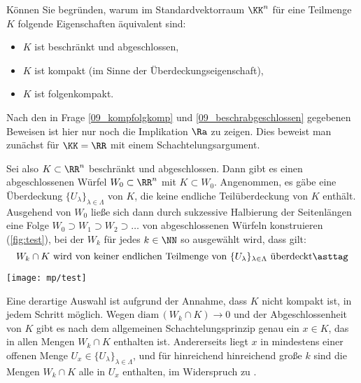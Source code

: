 \begin{frage}\label{09_abkompakt}
  Können Sie begründen, warum im Standardvektorraum $\KK^n$ für eine 
  Teilmenge $K$ folgende Eigenschaften äquivalent sind:
  \begin{itemize}[2mm]
  \item[\desc{a}] $K$ ist beschränkt und abgeschlossen,
  \item[\desc{b}] $K$ ist kompakt (im Sinne der Überdeckungseigenschaft),
  \item[\desc{c}] $K$ ist folgenkompakt.
  \end{itemize}
\end{frage}

\begin{antwort}
  Nach den in Frage \ref{09_kompfolgkomp}
  und \ref{09_beschrabgeschlossen} gegebenen Beweisen ist hier nur 
  noch die Implikation  $\Ra$  zu zeigen. 
  Dies beweist man zunächst für $\KK=\RR$  
  mit einem Schachtelungsargument.  

  Sei also $K\subset \RR^n$ beschränkt und abgeschlossen. 
  Dann gibt es einen  abgeschlossenen Würfel $W_0 \subset \RR^n$ mit 
  $K\subset W_0$. Angenommen, es gäbe eine Überdeckung 
  $\{U_\lambda \}_{\lambda\in \Lambda}$ von 
  $K$, die keine endliche Teilüberdeckung von $K$ enthält. 
  Ausgehend von $W_0$ ließe sich dann durch sukzessive 
  Halbierung der Seitenlängen eine Folge 
  $W_0 \supset W_1 \supset W_2 \supset \ldots$ von 
  abgeschlossenen Würfeln konstruieren (\sieheAbbildung\ref{fig:test}), 
  bei der $W_k$ für jedes $k\in \NN$ so ausgewählt wird, dass gilt: 
  \begin{equation}
    \text{$W_k \cap K$ wird von keiner 
      endlichen Teilmenge von $\{ U_\lambda \}_{\lambda \in\Lambda }$
      überdeckt}
    \asttag
  \end{equation}

  \begin{center}
    \texttt{[image: mp/test]}
    \label{fig:test}
  \end{center}

  Eine derartige Auswahl ist aufgrund der Annahme, dass $K$ nicht kompakt ist, 
  in jedem Schritt möglich. Wegen $\mathrm{diam}\,( W_k \cap K )\to 0$ 
  und der Abgeschlossenheit von $K$ gibt es nach dem allgemeinen 
  Schachtelungsprinzip genau ein $x\in K$, das in allen Mengen $W_k\cap K$ 
  enthalten ist. Andererseits liegt $x$ in mindestens einer offenen Menge 
  $U_x\in \{ U_\lambda \}_{\lambda \in\Lambda }$, und für hinreichend  
  hinreichend große $k$ sind die Mengen $W_k \cap K$ alle in $U_x$ enthalten, 
  im Widerspruch zu {\astref}.


\end{antwort}
